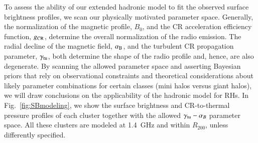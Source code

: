 \documentclass[useAMS,usenatbib]{mn2e}
\begin{document}
To assess the ability of our extended hadronic model to fit the observed surface
brightness profiles, we scan our physically motivated parameter
space. Generally, the normalization of the magnetic profile, $B_0$, and the CR
acceleration efficiency function, $g_{{\mathrm{CR}}}$, determine the overall
normalization of the radio emission. The radial decline of the magnetic field,
$ \alpha_{{\mathrm{B}}}$, and the turbulent CR propagation parameter, $\gamma_{{\mathrm{tu}}}$, both
determine the shape of the radio profile and, hence, are also degenerate. By
scanning the allowed parameter space and asserting Bayesian priors that rely on
observational constraints and theoretical considerations about likely parameter
combinations for certain classes (mini halos versus giant halos), we will draw
conclusions on the applicability of the hadronic model for RHs.  In
Fig.~\ref{fig:SBmodeling}, we show the surface brightness and CR-to-thermal
pressure profiles of each cluster together with the allowed
$\gamma_{{\mathrm{tu}}}-\alpha_{B}$ parameter space. All these clusters are
modeled at 1.4~GHz and within $R_{200}$, unless differently specified.
\end{document}
